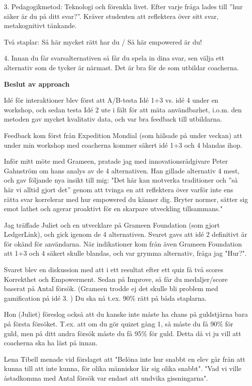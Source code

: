 3. Pedagogikmetod: Teknologi och förenkla livet. Efter varje fråga lades till ”hur säker är du på ditt svar?”. Kräver studenten att reflektera över sitt svar, metakognitivt tänkande.

Två staplar:
Så här mycket rätt har du / Så här empowered är du!

4. Innan du får svarsalternativen så får du spela in dina svar, sen välja ett alternativ som de tycker är närmast. Det är bra för de som utbildar coacherna.

\textbf{Beslut av approach}

Idé för interaktioner blev först att A/B-testa Idé 1+3 vs. idé 4 under en workshop, och sedan testa Idé 2 ute i fält för att mäta användbarhet, i.o.m. den metoden gav mycket kvalitativ data, och var bra feedback till utbildarna.

Feedback kom först från Expedition Mondial (som hälsade på under veckan) att under min workshop med coacherna kommer säkert idé 1+3 och 4 blandas ihop.

Inför mitt möte med Grameen, pratade jag med innovationsrådgivare Peter Gahnström om hans analys av de 4 alternativen. Han gillade alternativ 4 mest, och gav följande nya insikt till mig: "Det här kan motverka traditioner och ”så här vi alltid gjort det” genom att tvinga en att reflektera över varför inte ens rätta svar korrelerar med hur empowered du känner dig. Bryter normer, sätter sig emot lathet och agerar proaktivt för en skarpare utveckling tillsammans."

Jag träffade Juliet och en utvecklare på Grameen Foundation (som gjort LedgerLink), och gick igenom de 4 alternativen. Svaret gavs att idé 2 definitivt är för okänd för användarna. När indikationer kom från även Grameen Foundation att 1+3 och 4 säkert skulle blandas, och var grymma alternativ, fråga jag "Hur?".

Svaret blev en diskussion med att i ett resultat efter ett quiz få två scores Korrekthet och Empowerment. Sedan på Improve, så får du medaljer/score baserat på Antal försök. (Grameen trodde ej det skulle bli problem med gamification på idé 3. ) Du ska nå t.ex. 90\% rätt på båda staplarna.

Hon (Juliet) föreslog också att du kanske inte måste ha chans på guldstjärna bara på första försöket. T.ex. att om du gör quizet gång 1, så måste du få 90\% för guld, men på ditt andra försök måste du få 95\% för guld. Detta då vi ju vill att coacherna ska ha läst på innan.

Lena Tibell menade vid förslaget att "Belöna inte hur snabbt en elev går från att kunna till att inte kunna, för olika människor lär sig olika snabbt". "Vad vi ville åstadkomma med Antal försök var endast att undvika gissningarna".

